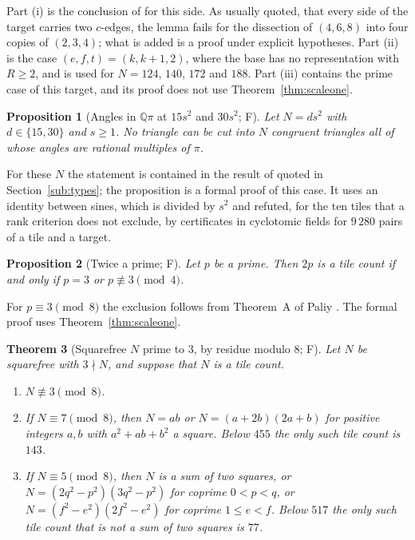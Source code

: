 \documentclass[11pt,reqno]{amsart}
\theoremstyle{plain}
\newtheorem{theorem}{Theorem}[section]
\newtheorem{proposition}[theorem]{Proposition}
\theoremstyle{definition}
\newcommand{\Q}{\mathbb{Q}}
\newcommand{\sF}{\textup{\textsf{F}}}
\begin{document}
Part (i) is the conclusion of \cite[Lem.~6]{BeesonIII} for this side. As usually quoted, that every side of
the target carries two $c$-edges, the lemma fails for the dissection of $(4,6,8)$ into four copies of
$(2,3,4)$; what is added is a proof under explicit hypotheses. Part (ii) is the case $(e,f,t)=(k,k+1,2)$,
where the base has no representation with $R\ge2$, and is used for $N=124$, $140$, $172$ and $188$. Part
(iii) contains the prime case of this target, and its proof does not use Theorem~\ref{thm:scaleone}.

\begin{proposition}[Angles in $\Q\pi$ at $15s^2$ and $30s^2$; \sF]\label{prop:gapA}
Let $N=ds^2$ with $d\in\{15,30\}$ and $s\ge1$. No triangle can be cut into $N$ congruent triangles all of
whose angles are rational multiples of $\pi$.
\end{proposition}

For these $N$ the statement is contained in the result of \cite{BeesonSeven} quoted in
Section~\ref{sub:types}; the proposition is a formal proof of this case. It uses an identity between sines,
which is divided by $s^2$ and refuted, for the ten tiles that a rank criterion does not exclude, by
certificates in cyclotomic fields for $9\,280$ pairs of a tile and a target.

\begin{proposition}[Twice a prime; \sF]\label{prop:twoprime}
Let $p$ be a prime. Then $2p$ is a tile count if and only if $p=3$ or $p\not\equiv3\pmod4$.
\end{proposition}

For $p\equiv3\pmod8$ the exclusion follows from Theorem~A of Paliy \cite{PaliySectors}. The formal proof
uses Theorem~\ref{thm:scaleone}.

\begin{theorem}[Squarefree $N$ prime to $3$, by residue modulo $8$; \sF]\label{thm:sqfree}
Let $N$ be squarefree with $3\nmid N$, and suppose that $N$ is a tile count.
\begin{enumerate}
\item[\textup{(i)}] $N\not\equiv3\pmod8$.
\item[\textup{(ii)}] If $N\equiv7\pmod8$, then $N=ab$ or $N=(a+2b)(2a+b)$ for positive integers $a,b$ with
$a^2+ab+b^2$ a square. Below $455$ the only such tile count is $143$.
\item[\textup{(iii)}] If $N\equiv5\pmod8$, then $N$ is a sum of two squares, or
$N=(2q^2-p^2)(3q^2-p^2)$ for coprime $0<p<q$, or $N=(f^2-e^2)(2f^2-e^2)$ for coprime $1\le e<f$. Below
$517$ the only such tile count that is not a sum of two squares is $77$.
\end{enumerate}
\end{theorem}
\end{document}
